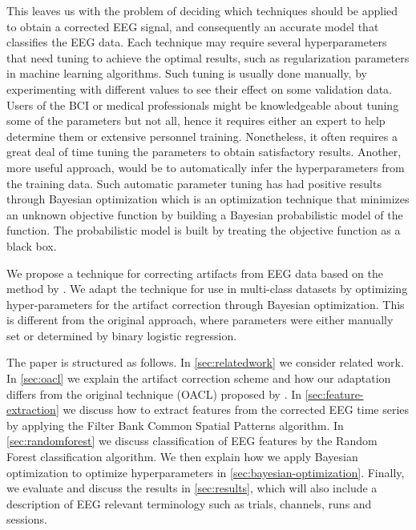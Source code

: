 This leaves us with the problem of deciding which techniques should be applied to obtain a corrected EEG signal, and consequently an accurate model that classifies the EEG data. Each technique may require several hyperparameters that need tuning to achieve the optimal results, such as regularization parameters in machine learning algorithms. Such tuning is usually done manually, by experimenting with different values to see their effect on some validation data. Users of the BCI or medical professionals might be knowledgeable about tuning some of the parameters but not all, hence it requires either an expert to help determine them or extensive personnel training. Nonetheless, it often requires a great deal of time tuning the parameters to obtain satisfactory results. Another, more useful approach, would be to automatically infer the hyperparameters from the training data. Such automatic parameter tuning has had positive results through Bayesian optimization \citep{brochu2010tutorial,snoek2012practical,shahriari2016taking} which is an optimization technique that minimizes an unknown objective function by building a Bayesian probabilistic model of the function. The probabilistic model is built by treating the objective function as a black box.

We propose a technique for correcting artifacts from EEG data based on the method by \citep{li2015ocular}. We adapt the technique for use in multi-class datasets by optimizing hyper-parameters for the artifact correction through Bayesian optimization. This is different from the original approach, where parameters were either manually set or determined by binary logistic regression.

The paper is structured as follows. In \cref{sec:relatedwork} we consider related work. In \cref{sec:oacl} we explain the artifact correction scheme and how our adaptation differs from the original technique (OACL) proposed by \citet{li2015ocular}. In \cref{sec:feature-extraction} we discuss how to extract features from the corrected EEG time series by applying the Filter Bank Common Spatial Patterns algorithm. In \cref{sec:randomforest} we discuss classification of EEG features by the Random Forest classification algorithm. We then explain how we apply Bayesian optimization to optimize hyperparameters in \cref{sec:bayesian-optimization}. Finally, we evaluate and discuss the results in \cref{sec:results}, which will also include a description of EEG relevant terminology such as trials, channels, runs and sessions.

